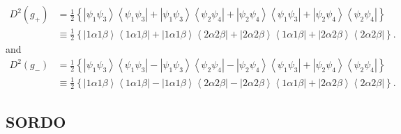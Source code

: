 \documentclass[aps,preprint]{revtex4}%
\begin{document}
\begin{align}
D^{2}\left(  g_{+}\right)   &  =\frac{1}{2}\left\{  \left\vert \psi_{1}%
\psi_{3}\right\rangle \left\langle \psi_{1}\psi_{3}\right\vert +\left\vert
\psi_{1}\psi_{3}\right\rangle \left\langle \psi_{2}\psi_{4}\right\vert
+\left\vert \psi_{2}\psi_{4}\right\rangle \left\langle \psi_{1}\psi
_{3}\right\vert +\left\vert \psi_{2}\psi_{4}\right\rangle \left\langle
\psi_{2}\psi_{4}\right\vert \right\} \nonumber\\
&  \equiv\frac{1}{2}\left\{  \left\vert 1\alpha1\beta\right\rangle
\left\langle 1\alpha1\beta\right\vert +\left\vert 1\alpha1\beta\right\rangle
\left\langle 2\alpha2\beta\right\vert +\left\vert 2\alpha2\beta\right\rangle
\left\langle 1\alpha1\beta\right\vert +\left\vert 2\alpha2\beta\right\rangle
\left\langle 2\alpha2\beta\right\vert \right\}  .
\end{align}
and
\begin{align}
D^{2}\left(  g_{-}\right)   &  =\frac{1}{2}\left\{  \left\vert \psi_{1}%
\psi_{3}\right\rangle \left\langle \psi_{1}\psi_{3}\right\vert -\left\vert
\psi_{1}\psi_{3}\right\rangle \left\langle \psi_{2}\psi_{4}\right\vert
-\left\vert \psi_{2}\psi_{4}\right\rangle \left\langle \psi_{1}\psi
_{3}\right\vert +\left\vert \psi_{2}\psi_{4}\right\rangle \left\langle
\psi_{2}\psi_{4}\right\vert \right\} \nonumber\\
&  \equiv\frac{1}{2}\left\{  \left\vert 1\alpha1\beta\right\rangle
\left\langle 1\alpha1\beta\right\vert -\left\vert 1\alpha1\beta\right\rangle
\left\langle 2\alpha2\beta\right\vert -\left\vert 2\alpha2\beta\right\rangle
\left\langle 1\alpha1\beta\right\vert +\left\vert 2\alpha2\beta\right\rangle
\left\langle 2\alpha2\beta\right\vert \right\}  .
\end{align}


\subsection{SORDO}
\end{document}
